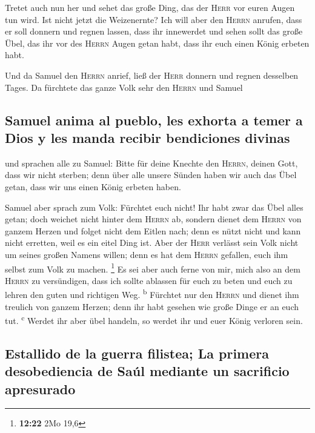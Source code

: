  Tretet auch nun her und sehet das große Ding, das der
\textsc{Herr} vor euren Augen tun wird.  Ist nicht jetzt
die Weizenernte? Ich will aber den \textsc{Herrn} anrufen, dass er soll
donnern und regnen lassen, dass ihr innewerdet und sehen sollt das große
Übel, das ihr vor des \textsc{Herrn} Augen getan habt, dass ihr euch
einen König erbeten habt.

 Und da Samuel den \textsc{Herrn} anrief, ließ der
\textsc{Herr} donnern und regnen desselben Tages. Da fürchtete das ganze
Volk sehr den \textsc{Herrn} und Samuel

\hypertarget{samuel-anima-al-pueblo-les-exhorta-a-temer-a-dios-y-les-manda-recibir-bendiciones-divinas}{%
\subsection{Samuel anima al pueblo, les exhorta a temer a Dios y les
manda recibir bendiciones
divinas}\label{samuel-anima-al-pueblo-les-exhorta-a-temer-a-dios-y-les-manda-recibir-bendiciones-divinas}}

 und sprachen alle zu Samuel: Bitte für deine Knechte den
\textsc{Herrn}, deinen Gott, dass wir nicht sterben; denn über alle
unsere Sünden haben wir auch das Übel getan, dass wir uns einen König
erbeten haben.

 Samuel aber sprach zum Volk: Fürchtet euch nicht! Ihr
habt zwar das Übel alles getan; doch weichet nicht hinter dem
\textsc{Herrn} ab, sondern dienet dem \textsc{Herrn} von ganzem Herzen
 und folget nicht dem Eitlen nach; denn es nützt nicht
und kann nicht erretten, weil es ein eitel Ding ist. 
Aber der \textsc{Herr} verlässt sein Volk nicht um seines großen Namens
willen; denn es hat dem \textsc{Herrn} gefallen, euch ihm selbst zum
Volk zu machen. \footnote{\textbf{12:22} 2Mo 19,6}  Es
sei aber auch ferne von mir, mich also an dem \textsc{Herrn} zu
versündigen, dass ich sollte ablassen für euch zu beten und euch zu
lehren den guten und richtigen Weg. \textsuperscript{b} 
Fürchtet nur den \textsc{Herrn} und dienet ihm treulich von ganzem
Herzen; denn ihr habt gesehen wie große Dinge er an euch tut.
\textsuperscript{c}  Werdet ihr aber übel handeln, so
werdet ihr und euer König verloren sein.

\hypertarget{estallido-de-la-guerra-filistea-la-primera-desobediencia-de-sauxfal-mediante-un-sacrificio-apresurado}{%
\subsection{Estallido de la guerra filistea; La primera desobediencia de
Saúl mediante un sacrificio
apresurado}\label{estallido-de-la-guerra-filistea-la-primera-desobediencia-de-sauxfal-mediante-un-sacrificio-apresurado}}

